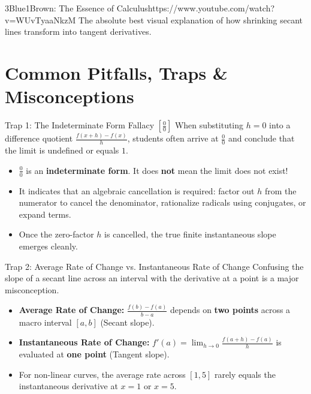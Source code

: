 \begin{videocard}{3Blue1Brown: The Essence of Calculus}{https://www.youtube.com/watch?v=WUvTyaaNkzM}
The absolute best visual explanation of how shrinking secant lines transform into tangent derivatives.
\end{videocard}

\section{Common Pitfalls, Traps \& Misconceptions}

\begin{trapbox}{Trap 1: The Indeterminate Form Fallacy $\left[\frac{0}{0}\right]$}
When substituting $h = 0$ into a difference quotient $\frac{f(x+h) - f(x)}{h}$, students often arrive at $\frac{0}{0}$ and conclude that the limit is undefined or equals $1$.
\begin{itemize}
    \item $\frac{0}{0}$ is an \textbf{indeterminate form}. It does \textbf{not} mean the limit does not exist!
    \item It indicates that an algebraic cancellation is required: factor out $h$ from the numerator to cancel the denominator, rationalize radicals using conjugates, or expand terms.
    \item Once the zero-factor $h$ is cancelled, the true finite instantaneous slope emerges cleanly.
\end{itemize}
\end{trapbox}

\begin{trapbox}{Trap 2: Average Rate of Change vs. Instantaneous Rate of Change}
Confusing the slope of a secant line across an interval with the derivative at a point is a major misconception.
\begin{itemize}
    \item \textbf{Average Rate of Change:} $\frac{f(b) - f(a)}{b - a}$ depends on \textbf{two points} across a macro interval $[a, b]$ (Secant slope).
    \item \textbf{Instantaneous Rate of Change:} $f'(a) = \lim_{h \to 0} \frac{f(a+h) - f(a)}{h}$ is evaluated at \textbf{one point} (Tangent slope).
    \item For non-linear curves, the average rate across $[1, 5]$ rarely equals the instantaneous derivative at $x = 1$ or $x = 5$.
\end{itemize}
\end{trapbox}

